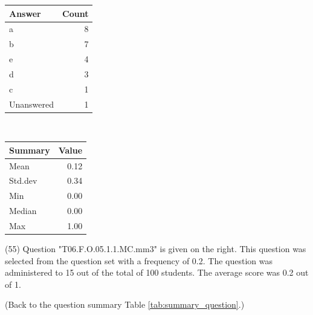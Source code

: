 \documentclass[12pt,nohyper]{tufte-handout}\usepackage[]{graphicx}\usepackage[]{color}
\begin{document}
\begin{center}%
\begin{tabular}{lr}
  \hline
Answer & Count \\ 
  \hline
a &   8 \\ 
  b &   7 \\ 
  e &   4 \\ 
  d &   3 \\ 
  c &   1 \\ 
  Unanswered &   1 \\ 
   \hline
\end{tabular}
~~~~~~~~%
\begin{tabular}{lr}
  \hline
Summary & Value \\ 
  \hline
Mean & 0.12 \\ 
  Std.dev & 0.34 \\ 
  Min & 0.00 \\ 
  Median & 0.00 \\ 
  Max & 1.00 \\ 
   \hline
\end{tabular}
\end{center}\newpage{} (55) Question "T06.F.O.05.1.1.MC.mm3" is given on the right. This question was selected from the question set with a frequency of 0.2. The question was administered to 15 out of the total of 100 students. The average score was 0.2 out of 1.

 (Back to the question summary Table \ref{tab:summary_question}.)
\end{document}
